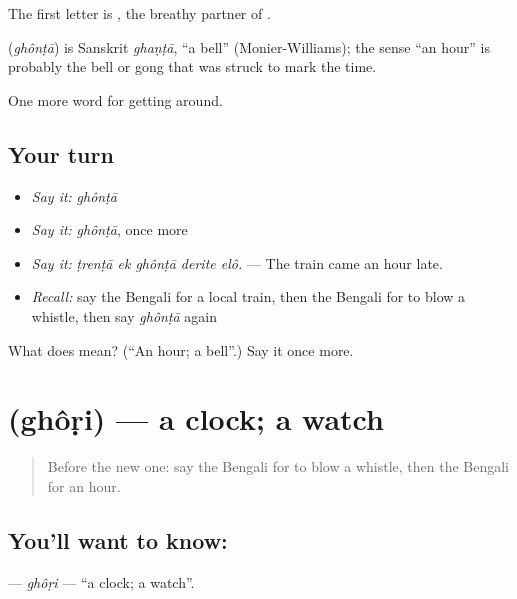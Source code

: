 The first letter is , the breathy partner of .

\begin{cousinweb}
\textbf{} (\emph{ghônṭā}) is Sanskrit \emph{ghaṇṭā}, \textquotedblleft{}a bell\textquotedblright{} (Monier-Williams); the sense \textquotedblleft{}an hour\textquotedblright{} is probably the bell or gong that was struck to mark the time.
\end{cousinweb}

\begin{grammarlens}[title={What you've built}]
One more word for getting around.
\end{grammarlens}

\subsection*{Your turn}
\begin{itemize}
\raggedright
  \item \emph{Say it:} \emph{ghônṭā}
  \item \emph{Say it:} \emph{ghônṭā}, once more
  \item \emph{Say it:} \emph{ṭrenṭā ek ghônṭā derite elô.} — The train came an hour late.
  \item \emph{Recall:} say the Bengali for a local train, then the Bengali for to blow a whistle, then say \emph{ghônṭā} again
\end{itemize}

\begin{tcolorbox}[breakable,colback=teal!4,colframe=teal!35!black,title={Before you move on}]
What does  mean? (\textquotedblleft{}An hour; a bell\textquotedblright{}.) Say it once more.
\end{tcolorbox}
\section[\texorpdfstring{\bn{ঘড়ি} (ghôṛi)}{ঘড়ি (ghôṛi)}]{ (ghôṛi) — a clock; a watch}

\label{lesson:BN-C385-ghori}



\begin{quote}
Before the new one: say the Bengali for to blow a whistle, then the Bengali for an hour.
\end{quote}

\subsection*{You'll want to know: }
\textbf{} — \emph{ghôṛi} — \textquotedblleft{}a clock; a watch\textquotedblright{}.

